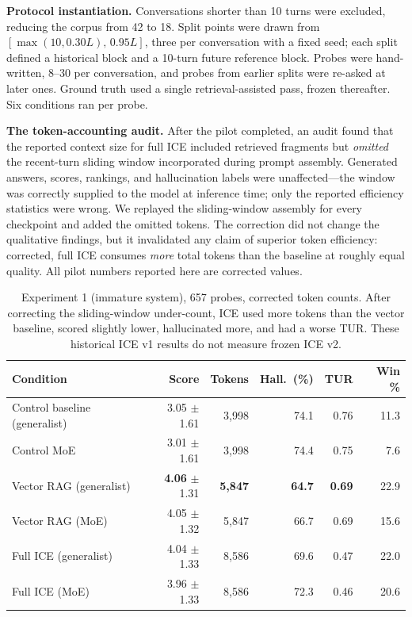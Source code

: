 \documentclass[twoside,11pt]{article}
\begin{document}
\textbf{Protocol instantiation.} Conversations shorter than 10 turns were excluded, reducing the corpus from 42 to 18. Split points were drawn from $[\max(10,0.30L),\,0.95L]$, three per conversation with a fixed seed; each split defined a historical block and a 10-turn future reference block. Probes were hand-written, 8--30 per conversation, and probes from earlier splits were re-asked at later ones. Ground truth used a single retrieval-assisted pass, frozen thereafter. Six conditions ran per probe.

\textbf{The token-accounting audit.} After the pilot completed, an audit found that the reported context size for full ICE included retrieved fragments but \emph{omitted} the recent-turn sliding window incorporated during prompt assembly. Generated answers, scores, rankings, and hallucination labels were unaffected---the window was correctly supplied to the model at inference time; only the reported efficiency statistics were wrong. We replayed the sliding-window assembly for every checkpoint and added the omitted tokens. The correction did not change the qualitative findings, but it invalidated any claim of superior token efficiency: corrected, full ICE consumes \emph{more} total tokens than the baseline at roughly equal quality. All pilot numbers reported here are corrected values.

\begin{table}[tbp]
\centering
\small


\begin{tabular}{@{}lrrrrr@{}}
\toprule
\textbf{Condition} & \textbf{Score} & \textbf{Tokens} & \textbf{Hall.\ (\%)} & \textbf{TUR} & \textbf{Win \%} \\
\midrule
Control baseline (generalist) & 3.05 $\pm$ 1.61 & 3{,}998  & 74.1 & 0.76 & 11.3 \\
Control MoE                   & 3.01 $\pm$ 1.61 & 3{,}998  & 74.4 & 0.75 & 7.6  \\
Vector RAG (generalist)       & \textbf{4.06} $\pm$ 1.31 & \textbf{5{,}847}  & \textbf{64.7} & \textbf{0.69} & 22.9 \\
Vector RAG (MoE)              & 4.05 $\pm$ 1.32 & 5{,}847  & 66.7 & 0.69 & 15.6 \\
Full ICE (generalist)         & 4.04 $\pm$ 1.33 & 8{,}586  & 69.6 & 0.47 & 22.0 \\
Full ICE (MoE)                & 3.96 $\pm$ 1.33 & 8{,}586  & 72.3 & 0.46 & 20.6 \\
\bottomrule
\end{tabular}
\caption{Experiment 1 (immature system), 657 probes, corrected token counts. After correcting the sliding-window under-count, ICE used more tokens than the vector baseline, scored slightly lower, hallucinated more, and had a worse TUR. These historical ICE v1 results do not measure frozen ICE v2.}
\label{tab:exp1}
\end{table}
\end{document}
